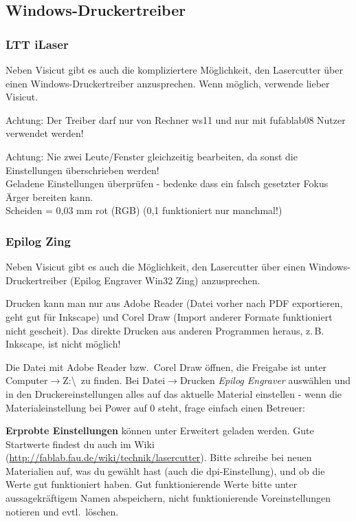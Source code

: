 \documentclass{\basedir/fablab-document}
\renewcommand{\todo}[1]{\textbf{\color{red}{TODO: #1}}}
\begin{document}
	\subsection{Windows-Druckertreiber}

	\subsubsection{LTT iLaser}\label{sec:ltt-windows}
	Neben Visicut gibt es auch die kompliziertere Möglichkeit, den Lasercutter über einen Windows-Druckertreiber anzusprechen. Wenn möglich, verwende lieber Visicut.


	Achtung: Der Treiber darf nur von Rechner ws11 und nur mit fufablab08 Nutzer verwendet werden!

	Achtung: Nie zwei Leute/Fenster gleichzeitig bearbeiten, da sonst die Einstellungen überschrieben werden! \\
	Geladene Einstellungen überprüfen - bedenke dass ein falsch gesetzter Fokus Ärger bereiten kann. \\
	Scheiden = 0,03 mm rot (RGB) (0,1 funktioniert nur manchmal!)

	\todo{...}

	\subsubsection{Epilog Zing}

	Neben Visicut gibt es auch die Möglichkeit, den Lasercutter über einen Windows-Druckertreiber (Epilog Engraver Win32 Zing) anzusprechen.

	Drucken kann man nur aus Adobe Reader (Datei vorher nach PDF exportieren, geht gut für Inkscape) und Corel Draw (Import anderer Formate funktioniert nicht gescheit).  Das direkte Drucken aus anderen Programmen heraus, z.\,B. Inkscape, ist nicht möglich!

	Die Datei mit Adobe Reader bzw.\  Corel Draw öffnen, die Freigabe ist unter Computer$\rightarrow$Z:\textbackslash \ zu finden. Bei Datei$\rightarrow$Drucken \textit{Epilog Engraver} auswählen und in den Druckereinstellungen alles auf das aktuelle Material einstellen - wenn die Materialeinstellung bei Power auf 0 steht, frage einfach einen Betreuer:

	\textbf{Erprobte Einstellungen} können unter Erweitert geladen werden. Gute Startwerte findest du auch im Wiki (\url{http://fablab.fau.de/wiki/technik/lasercutter}). Bitte schreibe bei neuen Materialien auf, was du gewählt hast (auch die dpi-Einstellung), und ob die Werte gut funktioniert haben. Gut funktionierende Werte bitte unter aussagekräftigem Namen abspeichern, nicht funktionierende Voreinstellungen notieren und evtl.\  löschen.
\end{document}
